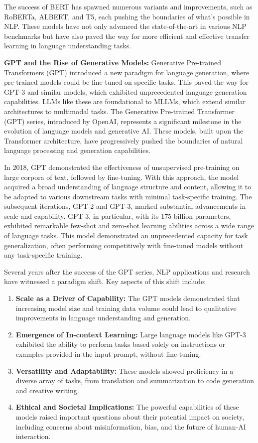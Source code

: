 The success of BERT has spawned numerous variants and improvements, such as RoBERTa, ALBERT, and T5, each pushing the boundaries of what's possible in NLP. These models have not only advanced the state-of-the-art in various NLP benchmarks but have also paved the way for more efficient and effective transfer learning in language understanding tasks.


\textbf{GPT and the Rise of Generative Models:} Generative Pre-trained Transformers (GPT) introduced a new paradigm for language generation, where pre-trained models could be fine-tuned on specific tasks. This paved the way for GPT-3 and similar models, which exhibited unprecedented language generation capabilities. LLMs like these are foundational to MLLMs, which extend similar architectures to multimodal tasks. The Generative Pre-trained Transformer (GPT) series, introduced by OpenAI, represents a significant milestone in the evolution of language models and generative AI. These models, built upon the Transformer architecture, have progressively pushed the boundaries of natural language processing and generation capabilities.

In 2018, GPT demonstrated the effectiveness of unsupervised pre-training on large corpora of text, followed by fine-tuning. With this approach, the model acquired a broad understanding of language structure and content, allowing it to be adapted to various downstream tasks with minimal task-specific training. The subsequent iterations, GPT-2 and GPT-3, marked substantial advancements in scale and capability. GPT-3, in particular, with its 175 billion parameters, exhibited remarkable few-shot and zero-shot learning abilities across a wide range of language tasks. This model demonstrated an unprecedented capacity for task generalization, often performing competitively with fine-tuned models without any task-specific training.

Several years after the success of the GPT series, NLP applications and research have witnessed a paradigm shift. Key aspects of this shift include:
\begin{enumerate}
    \item \textbf{Scale as a Driver of Capability:} The GPT models demonstrated that increasing model size and training data volume could lead to qualitative improvements in language understanding and generation.
    \item \textbf{Emergence of In-context Learning:} Large language models like GPT-3 exhibited the ability to perform tasks based solely on instructions or examples provided in the input prompt, without fine-tuning.
    \item \textbf{Versatility and Adaptability:} These models showed proficiency in a diverse array of tasks, from translation and summarization to code generation and creative writing.
    \item \textbf{Ethical and Societal Implications:} The powerful capabilities of these models raised important questions about their potential impact on society, including concerns about misinformation, bias, and the future of human-AI interaction.
\end{enumerate}

